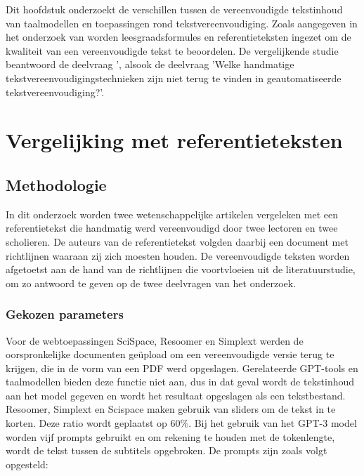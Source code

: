 Dit hoofdstuk onderzoekt de verschillen tussen de vereenvoudigde tekstinhoud van taalmodellen en toepassingen rond tekstvereenvoudiging. Zoals aangegeven in het onderzoek van \textcite{Nenkova2004} worden leesgraadsformules en referentieteksten ingezet om de kwaliteit van een vereenvoudigde tekst te beoordelen. De vergelijkende studie beantwoord de deelvraag ', alsook de deelvraag 'Welke handmatige tekstvereenvoudigingstechnieken zijn niet terug te vinden in geautomatiseerde tekstvereenvoudiging?'.

\section{Vergelijking met referentieteksten}

\subsection{Methodologie}

In dit onderzoek worden twee wetenschappelijke artikelen vergeleken met een referentietekst die handmatig werd vereenvoudigd door twee lectoren en twee scholieren. De auteurs van de referentietekst volgden daarbij een document met richtlijnen waaraan zij zich moesten houden. De vereenvoudigde teksten worden afgetoetst aan de hand van de richtlijnen die voortvloeien uit de literatuurstudie, om zo antwoord te geven op de twee deelvragen van het onderzoek. 


\subsubsection{Gekozen parameters}
Voor de webtoepassingen SciSpace, Resoomer en Simplext werden de oorspronkelijke documenten geüpload om een vereenvoudigde versie terug te krijgen, die in de vorm van een PDF werd opgeslagen. Gerelateerde GPT-tools en taalmodellen bieden deze functie niet aan, dus in dat geval wordt de tekstinhoud aan het model gegeven en wordt het resultaat opgeslagen als een tekstbestand. Resoomer, Simplext en Scispace maken gebruik van sliders om de tekst in te korten. Deze ratio wordt geplaatst op 60\%. Bij het gebruik van het GPT-3 model worden vijf prompts gebruikt en om rekening te houden met de tokenlengte, wordt de tekst tussen de subtitels opgebroken. De prompts zijn zoals volgt opgesteld:

